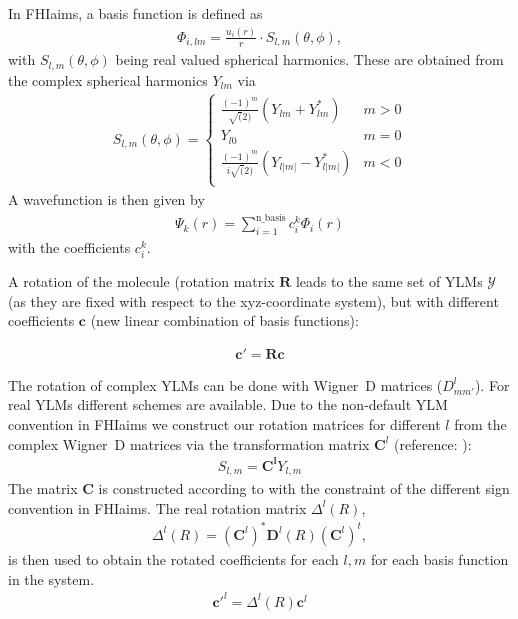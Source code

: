 In FHIaims, a basis function is defined as
\begin{align}
    \Phi_{i,lm} = \frac{u_i(r)}{r}\cdot S_{l,m}(\theta, \phi),
\end{align}
with $S_{l,m}(\theta, \phi)$ being real valued spherical harmonics. These are
obtained from the complex spherical harmonics $Y_{lm}$ via
\begin{align}
        S_{l,m}(\theta, \phi) = 
    \begin{cases} 
            \frac{(-1)^m}{\sqrt(2)}(Y_{lm} + Y_{lm}^*) & m > 0\\
            Y_{l0} & m=0\\
            \frac{(-1)^m}{i\sqrt(2)}(Y_{l|m|} - Y_{l|m|}^*) & m < 0\\
    \end{cases}
\end{align}
A wavefunction is then given by
\begin{align}
        \Psi_k(r) = \sum_{i=1}^{\text{n\_basis}}c_i^k\Phi_i(r)
\end{align}
with the coefficients $c_i^k$. 

A rotation of the molecule (rotation matrix $\mathbf{R}$ leads to the same set
of YLMs $\mathcal{Y}$ (as they are fixed with respect to the xyz-coordinate
system), but with different coefficients $\mathbf{c}$ (new linear combination
of basis functions):

\begin{align}
    \mathbf{c'} = \mathbf{R}\mathbf{c}
\end{align}

The rotation of complex YLMs can be done with Wigner~D matrices ($D^l_{mm'}$).
For real YLMs different schemes are
available\cite{lessig_efficient_2012,aubert_alternative_2013,blanco_evaluation_1997}.
Due to the non-default YLM convention in FHIaims we construct our rotation
matrices for different $l$ from the complex Wigner~D matrices via the
transformation matrix $\mathbf{C}^l$ (reference:
\cite{blanco_evaluation_1997}):
\begin{align}
        S_{l,m} = \mathbf{C^l}Y_{l,m}
\end{align}
The matrix $\mathbf{C}$ is constructed according to
\cite{blanco_evaluation_1997} with the constraint of the different sign
convention in FHIaims. The real rotation matrix $\Delta^l(R)$,
\begin{align}
        \Delta^l(R) = \left(\mathbf{C}^l\right)^*\mathbf{D}^l(R)\left(\mathbf{C}^l\right)^t,
\end{align}
is then used to obtain the rotated coefficients for each $l, m$ for each basis
function in the system.
\begin{align}
    \mathbf{c}'^{l} = \Delta^l(R)\mathbf{c}^{l}
\end{align}
